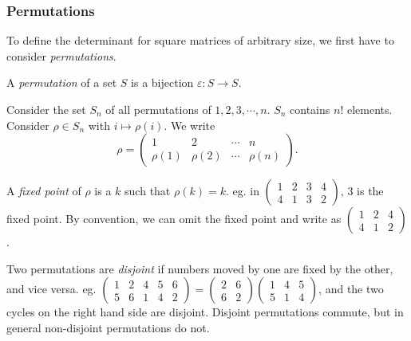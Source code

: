 \documentclass[a4paper]{article}
\begin{document}
\subsubsection{Permutations}
To define the determinant for square matrices of arbitrary size, we first have to consider \emph{permutations}.

\begin{defi}[Permutation]
  A \emph{permutation} of a set $S$ is a bijection $\varepsilon: S\to S$.
\end{defi}

\begin{notation}
  Consider the set $S_n$ of all permutations of $1, 2, 3, \cdots , n$. $S_n$ contains $n!$ elements. Consider $\rho\in S_n$ with $i \mapsto \rho(i)$. We write
  \[
    \rho = \begin{pmatrix} 1 & 2 & \cdots & n\\ \rho(1) & \rho (2) &\cdots & \rho (n)\end{pmatrix}.
  \]
\end{notation}

\begin{defi}
  A \emph{fixed point} of $\rho$ is a $k$ such that $\rho(k) = k$. eg. in $\begin{pmatrix} 1 & 2 & 3 & 4\\4 & 1 & 3 & 2\end{pmatrix}$, $3$ is the fixed point. By convention, we can omit the fixed point and write as $\begin{pmatrix} 1 & 2 & 4\\ 4 & 1 & 2\end{pmatrix}$.
\end{defi}

\begin{defi}
  Two permutations are \emph{disjoint} if numbers moved by one are fixed by the other, and vice versa. eg. $\begin{pmatrix} 1 & 2 & 4 & 5 & 6\\ 5 & 6 & 1 & 4 & 2\end{pmatrix} = \begin{pmatrix}2 & 6\\ 6& 2\end{pmatrix}\begin{pmatrix}1 & 4 & 5\\5 & 1 & 4\end{pmatrix}$, and the two cycles on the right hand side are disjoint. Disjoint permutations commute, but in general non-disjoint permutations do not.
\end{defi}
\end{document}
